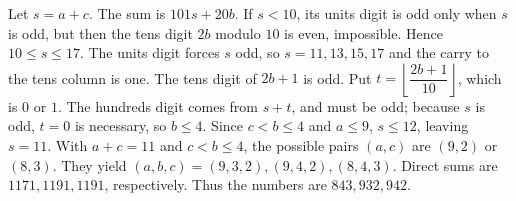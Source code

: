 Let $s=a+c$. The sum is $101s+20b$. If $s<10$, its units digit is odd only when $s$ is odd, but then the tens digit $2b$ modulo $10$ is even, impossible. Hence $10\le s\le17$. The units digit forces $s$ odd, so $s=11,13,15,17$ and the carry to the tens column is one. The tens digit of $2b+1$ is odd. Put $t=\left\lfloor\dfrac{2b+1}{10}\right\rfloor$, which is $0$ or $1$. The hundreds digit comes from $s+t$, and must be odd; because $s$ is odd, $t=0$ is necessary, so $b\le4$. Since $c<b\le4$ and $a\le9$, $s\le12$, leaving $s=11$. With $a+c=11$ and $c<b\le4$, the possible pairs $(a,c)$ are $(9,2)$ or $(8,3)$. They yield $(a,b,c)=(9,3,2),(9,4,2),(8,4,3)$. Direct sums are $1171,1191,1191$, respectively. Thus the numbers are $\boxed{843,932,942}$.
